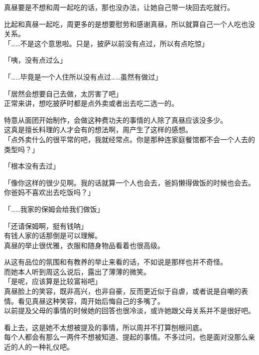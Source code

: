 真昼要是不想和周一起吃的话，那也没办法，让她自己带一块回去吃就行。

比起和真昼一起吃，周更多的是想要慰劳和感谢真昼，所以就算自己一个人吃也没关系。\\

「……不是这个意思啦。只是，披萨以前没有点过，所以有点吃惊」

「咦，没有点过么」

「……毕竟是一个人住所以没有点过……虽然有做过」

「居然会想要自己去做，太厉害了吧」\\

正常来讲，想吃披萨时都是点外卖或者出去吃二选一的。

特意从面团开始制作，会做这种费功夫的事情的人除了真昼应该没多少。\\

这真是擅长料理的人才会有的想法啊，周产生了这样的感想。\\

「点外卖什么的很平常的吧，我就经常点。你是那种连家庭餐馆都不会一个人去的类型吗？」

「根本没有去过」

「像你这样的很少见啊。我的话就算一个人也会去，爸妈懒得做饭的时候也会去。你爸妈不喜欢出去吃饭吗？」

「……我家的保姆会给我们做饭」

「还请保姆啊，挺有钱呐」\\

有钱人家的话那倒是可以理解。\\

真昼的举止很优雅，衣服和随身物品看着也很高级。

从这有品位的氛围和有教养的举止来看的话，不如说是那样也并不奇怪。\\

而她本人听到周这么说后，露出了薄薄的微笑。\\

「是呢，应该算是比较富裕吧」\\

真昼脸上的笑容，既非高兴，也非自豪，反而更近似于自虐，或者说是自嘲的表情。看见真昼这种笑容，周开始后悔自己的多嘴了。\\

以前提及父母的事情的时候她的回答也很冷淡，或许她跟父母关系并不是很好吧。

看上去，这是她不太想被提及的事情，所以周并不打算刨根问底。\\

每个人都会有那么一两件不想被知道、提起的事情。不多过问，也是面对没那么亲近的人的一种礼仪吧。\\

